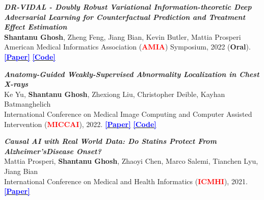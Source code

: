 {\begin{enumerate}[label=\texttt{[C\arabic*]}, start=9]
        \addtocounter{enumi}{-2}
        \item \textit{\textbf{DR-VIDAL - Doubly Robust Variational Information-theoretic Deep Adversarial Learning for Counterfactual Prediction and Treatment Effect Estimation}} 
        \\ \textbf{Shantanu Ghosh}, Zheng Feng, Jiang Bian, Kevin Butler, Mattia Prosperi
        \\ American Medical Informatics Association (\textcolor{red}{\textbf{AMIA}}) Symposium, 2022 (\textbf{Oral}). \href{https://www.ncbi.nlm.nih.gov/pmc/articles/PMC10148269/}
        {\textbf{\textcolor{blue}{[Paper]}}}
        \href{https://github.com/shantanu-ai/DR-VIDAL-AMIA-22}
        {\textbf{\textcolor{blue}{[Code]}}}

        \addtocounter{enumi}{-2}
        \item \textit{\textbf{Anatomy-Guided Weakly-Supervised Abnormality Localization in Chest X-rays}} 
        \\ Ke Yu, \textbf{Shantanu Ghosh}, Zhexiong Liu,  Christopher Deible, Kayhan Batmanghelich
        \\ International Conference on Medical Image Computing and Computer Assisted Intervention 
        (\textcolor{red}{\textbf{MICCAI}}), 2022. \href{https://arxiv.org/abs/2206.12704}
        {\textbf{\textcolor{blue}{[Paper]}}}
        \href{https://github.com/batmanlab/AGXNet}
        {\textbf{\textcolor{blue}{[Code]}}}

        \addtocounter{enumi}{-2}
        \item \textit{\textbf{Causal AI with Real World Data:  Do Statins Protect From Alzheimer’sDisease Onset?}} 
        \\ Mattia Prosperi, \textbf{Shantanu Ghosh}, Zhaoyi Chen, Marco Salemi, Tianchen Lyu, Jiang Bian
        \\International Conference on Medical and Health Informatics (\textcolor{red}{\textbf{ICMHI}}), 2021. \href{https://drive.google.com/file/d/1rQkeW6QeqWp5Xo9HRgWaaIE846dgvKz4/view}
        {\textbf{\textcolor{blue}{[Paper]}}}
    
        \end{enumerate}
      } 
    

  